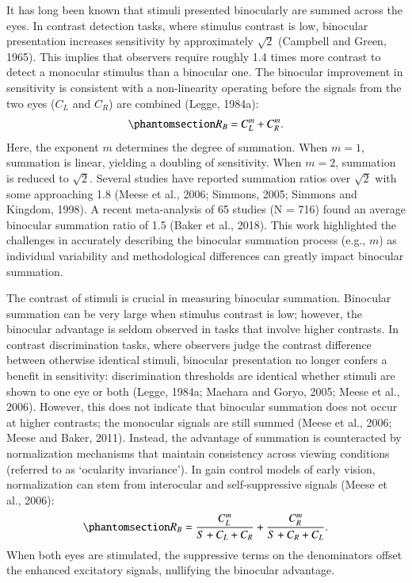 \documentclass[review,
  12pt,
]{elsarticle}
\begin{document}
It has long been known that stimuli presented binocularly are summed
across the eyes. In contrast detection tasks, where stimulus contrast is
low, binocular presentation increases sensitivity by approximately
\(\sqrt{2}\) (Campbell and Green, 1965). This implies that observers
require roughly 1.4 times more contrast to detect a monocular stimulus
than a binocular one. The binocular improvement in sensitivity is
consistent with a non-linearity operating before the signals from the
two eyes (\(C_L\) and \(C_R\)) are combined (Legge, 1984a):
\begin{equation}\phantomsection\label{eq-IntroMath1}{
R_B = C_L^m + C_R^m.
}\end{equation} Here, the exponent \(m\) determines the degree of
summation. When \(m = 1\), summation is linear, yielding a doubling of
sensitivity. When \(m = 2\), summation is reduced to \(\sqrt{2}\).
Several studies have reported summation ratios over \(\sqrt{2}\) with
some approaching 1.8 (Meese et al., 2006; Simmons, 2005; Simmons and
Kingdom, 1998). A recent meta-analysis of 65 studies (N = 716) found an
average binocular summation ratio of 1.5 (Baker et al., 2018). This work
highlighted the challenges in accurately describing the binocular
summation process (e.g., \(m\)) as individual variability and
methodological differences can greatly impact binocular summation.

The contrast of stimuli is crucial in measuring binocular summation.
Binocular summation can be very large when stimulus contrast is low;
however, the binocular advantage is seldom observed in tasks that
involve higher contrasts. In contrast discrimination tasks, where
observers judge the contrast difference between otherwise identical
stimuli, binocular presentation no longer confers a benefit in
sensitivity: discrimination thresholds are identical whether stimuli are
shown to one eye or both (Legge, 1984a; Maehara and Goryo, 2005; Meese
et al., 2006). However, this does not indicate that binocular summation
does not occur at higher contrasts; the monocular signals are still
summed (Meese et al., 2006; Meese and Baker, 2011). Instead, the
advantage of summation is counteracted by normalization mechanisms that
maintain consistency across viewing conditions (referred to as
`ocularity invariance'). In gain control models of early vision,
normalization can stem from interocular and self-suppressive signals
(Meese et al., 2006):
\begin{equation}\phantomsection\label{eq-intoMath2}{
R_B = \frac{C_L^m}{S+C_L+C_R} + \frac{C_R^m}{S+C_R+C_L}.
}\end{equation} When both eyes are stimulated, the suppressive terms on
the denominators offset the enhanced excitatory signals, nullifying the
binocular advantage.
\end{document}

